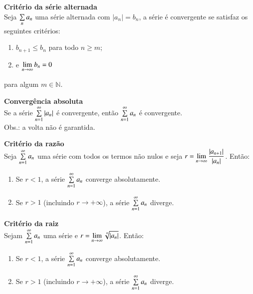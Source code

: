 \textbf{Critério da série alternada}\\
Seja $\sum\limits_n a_n$ uma série alternada com $\left| a_n \right| = b_n$, a série é convergente se satisfaz os seguintes critérios:
\begin{enumerate}
	\item $b_{n+1} \le b_n$ para todo $n\ge m$;
	\item e $\displaystyle\lim_{n \to \infty} b_n = 0$
\end{enumerate}
para algum $m \in \mathbb{N}$.
\newspaceline

\textbf{Convergência absoluta}\\
Se a série $\sum\limits_{n=1}^{\infty} \left| a_n \right|$ é convergente, então $\sum\limits_{n=1}^{\infty} a_n$ é convergente. \\
Obs.: a volta não é garantida.
\newspaceline

\textbf{Critério da razão}\\
Seja $\sum\limits_{n=1}^{\infty} a_n$ uma série com todos os termos não nulos e seja $r=\displaystyle\lim_{n \to\infty} \dfrac{\left| a_{n+1} \right|}{\left| a_n \right|}$. Então:
\begin{enumerate}
	\item Se $r<1$, a série $\sum\limits_{n=1}^{\infty} a_n$ converge absolutamente.
	\item Se $r>1$ (incluindo $r\to+\infty$), a série $\sum\limits_{n=1}^\infty a_n$ diverge.
\end{enumerate}
\vspace{5pt}

\textbf{Critério da raiz}\\
Sejam $\sum\limits_{n=1}^\infty a_n$ uma série e $r=\displaystyle\lim_{n \to\infty}\sqrt[n]{\left| a_n \right|}$. Então:
\begin{enumerate}
	\item Se $r<1$, a série $\sum\limits_{n=1}^\infty a_n$ converge absolutamente.
	\item Se $r>1$ (incluindo $r\to+\infty$), a série $\sum\limits_{n=1}^\infty a_n$ diverge.
\end{enumerate}

